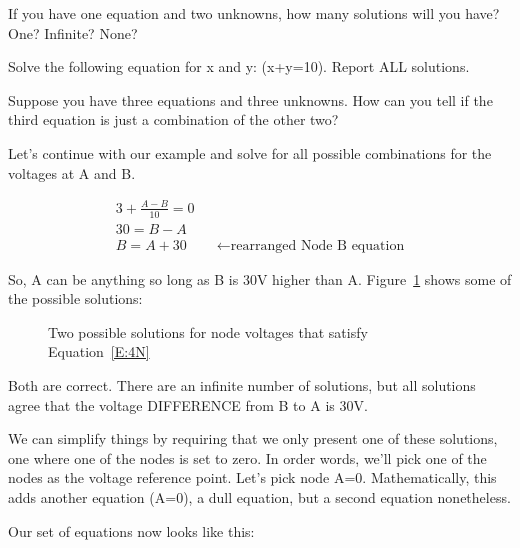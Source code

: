 \begin{blevel}
If you have one equation and two unknowns, how many solutions will you have? One? Infinite? None?
\end{blevel}

\begin{clevel}
Solve the following equation for x and y: (x+y=10). Report ALL solutions.
\end{clevel}

\begin{dlevel}
Suppose you have three equations and three unknowns. How can you tell if the third equation is just a combination of the other two?
\end{dlevel}

Let's continue with our example and solve for all possible combinations for the voltages at A and B.
\par
\begin{align*}
3 + \frac{A-B}{10}=0\tag{Node B}\\
30 = B-A\\
B = A+30&&\leftarrow \text{rearranged Node B equation}
\end{align*} 

So, A can be anything so long as B is 30V higher than A. Figure~\ref{F:4NS} shows some of the possible solutions:

\begin{figure}[H]
\begin{center}
\caption{Two possible solutions for node voltages that satisfy Equation~\ref{E:4N}}
\label{F:4NS}
\end{center}
\end{figure}

Both are correct. There are an infinite number of solutions, but all solutions agree that the voltage DIFFERENCE from B to A is 30V.
\par
We can simplify things by requiring that we only present one of these solutions, one where one of the nodes is set to zero. In order words, we'll pick one of the nodes as the voltage reference point. Let's pick node A=0. Mathematically, this adds another equation (A=0), a dull equation, but a second equation nonetheless.\par
Our set of equations now looks like this:

